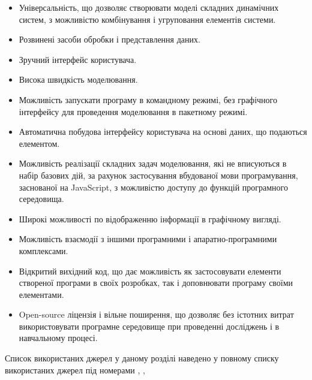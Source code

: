 \begin{itemize}

  \item
    Універсальність, що дозволяє створювати моделі складних
    динамічних систем, з можливістю комбінування і угруповання
    елементів системи.

  \item
    Розвинені засоби обробки і представлення даних.

  \item
    Зручний інтерфейс користувача.

  \item
    Висока швидкість моделювання.

  \item
    Можливість запускати програму в командному режимі, без
    графічного інтерфейсу для проведення моделювання в пакетному
    режимі.

  \item
    Автоматична побудова інтерфейсу користувача на основі даних,
    що подаються елементом.

  \item
    Можливість реалізації складних задач моделювання, які не
    вписуються в набір базових дій, за рахунок застосування
    вбудованої мови програмування, заснованої на JavaScript, з
    можливістю доступу до функцій програмного середовища.

  \item
    Широкі можливості по відображенню інформації в графічному
    вигляді.

  \item
    Можливість взаємодії з іншими програмними і
    апаратно-програмними комплексами.


  \item
    Відкритий вихідний код, що дає можливість як застосовувати
    елементи створеної програми в своїх розробках, так і доповнювати
    програму своїми елементами.


  \item
    Open-source ліцензія і вільне поширення, що дозволяє без істотних
    витрат використовувати програмне середовище при проведенні
    досліджень і в навчальному процесі.

\end{itemize}

Список використаних джерел у даному розділі наведено у повному
списку використаних джерел під номерами
\cite{atu_asau26},
\cite{atu_asau26},
\cite{atu_jacs2015}



